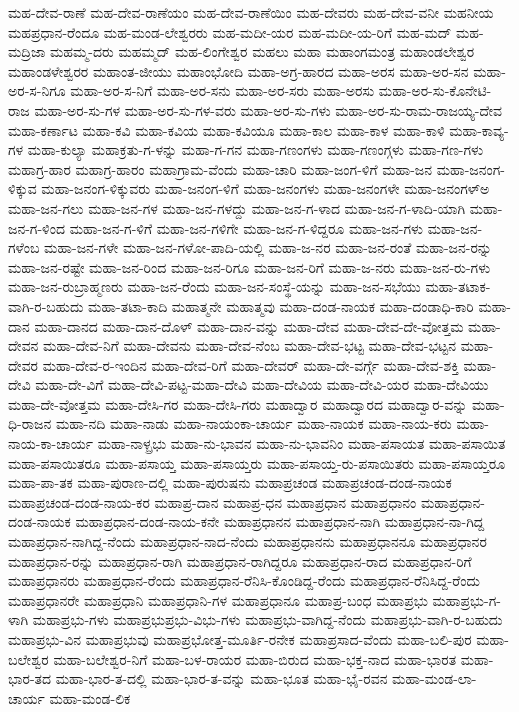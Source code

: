 ಮಹ-ದೇವ-ರಾಣೆ
ಮಹ-ದೇವ-ರಾಣೆಯಂ
ಮಹ-ದೇವ-ರಾಣೆಯಿಂ
ಮಹ-ದೇವರು
ಮಹ-ದೇವ-ವನೀ
ಮಹನೀಯ
ಮಹಪ್ರಧಾನ-ರೆಂದೂ
ಮಹ-ಮಂಡ-ಲೇಶ್ವರರು
ಮಹ-ಮದೀ-ಯರ
ಮಹ-ಮದೀ-ಯ-ರಿಗೆ
ಮಹ-ಮದ್
ಮಹ-ಮದ್ರಿಜಾ
ಮಹಮ್ಮ-ದರು
ಮಹಮ್ಮದ್
ಮಹ-ಲಿಂಗೇಶ್ವರ
ಮಹಲು
ಮಹಾ
ಮಹಾಂಗಮಂತ್ರ
ಮಹಾಂಡಲೇಶ್ವರ
ಮಹಾಂಡಳೇಶ್ವರರ
ಮಹಾಂತ-ಜೀಯು
ಮಹಾಂಭೋದಿ
ಮಹಾ-ಅಗ್ರ-ಹಾರದ
ಮಹಾ-ಅರಸ
ಮಹಾ-ಅರ-ಸನ
ಮಹಾ-ಅರ-ಸ-ನಿಗೂ
ಮಹಾ-ಅರ-ಸ-ನಿಗೆ
ಮಹಾ-ಅರ-ಸನು
ಮಹಾ-ಅರ-ಸರು
ಮಹಾ-ಅರಸು
ಮಹಾ-ಅರ-ಸು-ಕೊನೇಟಿ-ರಾಜ
ಮಹಾ-ಅರ-ಸು-ಗಳ
ಮಹಾ-ಅರ-ಸು-ಗಳ-ವರು
ಮಹಾ-ಅರ-ಸು-ಗಳು
ಮಹಾ-ಅರ-ಸು-ರಾಮ-ರಾಜಯ್ಯ-ದೇವ
ಮಹಾ-ಕರ್ಣಾಟ
ಮಹಾ-ಕವಿ
ಮಹಾ-ಕವಿಯ
ಮಹಾ-ಕವಿಯೂ
ಮಹಾ-ಕಾಲ
ಮಹಾ-ಕಾಳ
ಮಹಾ-ಕಾಳಿ
ಮಹಾ-ಕಾವ್ಯ-ಗಳ
ಮಹಾ-ಕುಲ್ಯಾ
ಮಹಾಕ್ರತು-ಗ-ಳನ್ನು
ಮಹಾ-ಗ-ಗನ
ಮಹಾ-ಗಣಂಗಳು
ಮಹಾ-ಗಣಂಗ್ಗಳು
ಮಹಾ-ಗಣ-ಗಳು
ಮಹಾಗ್ರ-ಹಾರ
ಮಹಾಗ್ರ-ಹಾರಂ
ಮಹಾಗ್ರಾಮ-ವೆಂದು
ಮಹಾ-ಚಾರಿ
ಮಹಾ-ಜಂಗ-ಳಿಗೆ
ಮಹಾ-ಜನ
ಮಹಾ-ಜನಂಗ-ಳಿಕ್ಕುವ
ಮಹಾ-ಜನಂಗ-ಳಿಕ್ಕುವರು
ಮಹಾ-ಜನಂಗ-ಳಿಗೆ
ಮಹಾ-ಜನಂಗಳು
ಮಹಾ-ಜನಂಗಳೇ
ಮಹಾ-ಜನಂಗಳ್ಅ
ಮಹಾ-ಜನ-ಗಲು
ಮಹಾ-ಜನ-ಗಳ
ಮಹಾ-ಜನ-ಗಳದ್ದು
ಮಹಾ-ಜನ-ಗ-ಳಾದ
ಮಹಾ-ಜನ-ಗ-ಳಾದಿ-ಯಾಗಿ
ಮಹಾ-ಜನ-ಗ-ಳಿಂದ
ಮಹಾ-ಜನ-ಗ-ಳಿಗೆ
ಮಹಾ-ಜನ-ಗಳಿಗೇ
ಮಹಾ-ಜನ-ಗ-ಳಿದ್ದರೂ
ಮಹಾ-ಜನ-ಗಳು
ಮಹಾ-ಜನ-ಗಳೆಂಬ
ಮಹಾ-ಜನ-ಗಳೇ
ಮಹಾ-ಜನ-ಗಳೋ-ಪಾದಿ-ಯಲ್ಲಿ
ಮಹಾ-ಜ-ನರ
ಮಹಾ-ಜನ-ರಂತೆ
ಮಹಾ-ಜನ-ರನ್ನು
ಮಹಾ-ಜನ-ರಷ್ಟೇ
ಮಹಾ-ಜನ-ರಿಂದ
ಮಹಾ-ಜನ-ರಿಗೂ
ಮಹಾ-ಜನ-ರಿಗೆ
ಮಹಾ-ಜ-ನರು
ಮಹಾ-ಜನ-ರು-ಗಳು
ಮಹಾ-ಜನ-ರುಬ್ರಾಹ್ಮಣರು
ಮಹಾ-ಜನ-ರೆಂದು
ಮಹಾ-ಜನ-ಸಂಸ್ಥೆ-ಯನ್ನು
ಮಹಾ-ಜನ-ಸಭೆಯು
ಮಹಾ-ತಟಾಕ-ವಾಗಿ-ರ-ಬಹುದು
ಮಹಾ-ತಟಾ-ಕಾದಿ
ಮಹಾತ್ಮನೇ
ಮಹಾತ್ಮವು
ಮಹಾ-ದಂಡ-ನಾಯಕ
ಮಹಾ-ದಂಡಾಧಿ-ಕಾರಿ
ಮಹಾ-ದಾನ
ಮಹಾ-ದಾನದ
ಮಹಾ-ದಾನ-ದೊಳ್
ಮಹಾ-ದಾನ-ವನ್ನು
ಮಹಾ-ದೇವ
ಮಹಾ-ದೇವ-ದೇ-ವೋತ್ತಮ
ಮಹಾ-ದೇವನ
ಮಹಾ-ದೇವ-ನಿಗೆ
ಮಹಾ-ದೇವನು
ಮಹಾ-ದೇವ-ನೆಂಬ
ಮಹಾ-ದೇವ-ಭಟ್ಟ
ಮಹಾ-ದೇವ-ಭಟ್ಟನ
ಮಹಾ-ದೇವರ
ಮಹಾ-ದೇವ-ರ-ಇಂದಿನ
ಮಹಾ-ದೇವ-ರಿಗೆ
ಮಹಾ-ದೇವರ್
ಮಹಾ-ದೇ-ವರ್ಗ್ಗೆ
ಮಹಾ-ದೇವ-ಶಕ್ತಿ
ಮಹಾ-ದೇವಿ
ಮಹಾ-ದೇ-ವಿಗೆ
ಮಹಾ-ದೇವಿ-ಪಟ್ಟ-ಮಹಾ-ದೇವಿ
ಮಹಾ-ದೇವಿಯ
ಮಹಾ-ದೇವಿ-ಯರ
ಮಹಾ-ದೇವಿಯು
ಮಹಾ-ದೇ-ವೋತ್ತಮ
ಮಹಾ-ದೇಸಿ-ಗರ
ಮಹಾ-ದೇಸಿ-ಗರು
ಮಹಾದ್ವಾರ
ಮಹಾದ್ವಾರದ
ಮಹಾದ್ವಾರ-ವನ್ನು
ಮಹಾ-ಧಿ-ರಾಜನ
ಮಹಾ-ನದಿ
ಮಹಾ-ನಾಡು
ಮಹಾ-ನಾಯಂಕಾ-ಚಾರ್ಯ
ಮಹಾ-ನಾಯಕ
ಮಹಾ-ನಾಯ-ಕರು
ಮಹಾ-ನಾಯ-ಕಾ-ಚಾರ್ಯ
ಮಹಾ-ನಾಳ್ಪ್ರಭು
ಮಹಾ-ನು-ಭಾವನ
ಮಹಾ-ನು-ಭಾವನಿಂ
ಮಹಾ-ಪಸಾಯತ
ಮಹಾ-ಪಸಾಯಿತ
ಮಹಾ-ಪಸಾಯಿತರೂ
ಮಹಾ-ಪಸಾಯ್ತ
ಮಹಾ-ಪಸಾಯ್ತರು
ಮಹಾ-ಪಸಾಯ್ತ-ರು-ಪಸಾಯಿತರು
ಮಹಾ-ಪಸಾಯ್ತರೂ
ಮಹಾ-ಪಾ-ತಕ
ಮಹಾ-ಪುರಾಣ-ದಲ್ಲಿ
ಮಹಾ-ಪುರುಷನು
ಮಹಾಪ್ರಚಂಡ
ಮಹಾಪ್ರಚಂಡ-ದಂಡ-ನಾಯಕ
ಮಹಾಪ್ರಚಂಡ-ದಂಡ-ನಾಯ-ಕರ
ಮಹಾಪ್ರ-ದಾನ
ಮಹಾಪ್ರ-ಧನ
ಮಹಾಪ್ರಧಾನ
ಮಹಾಪ್ರಧಾನಂ
ಮಹಾಪ್ರಧಾನ-ದಂಡ-ನಾಯಕ
ಮಹಾಪ್ರಧಾನ-ದಂಡ-ನಾಯ-ಕನೇ
ಮಹಾಪ್ರಧಾನನ
ಮಹಾಪ್ರಧಾನ-ನಾಗಿ
ಮಹಾಪ್ರಧಾನ-ನಾ-ಗಿದ್ದ
ಮಹಾಪ್ರಧಾನ-ನಾಗಿದ್ದ-ನೆಂದು
ಮಹಾಪ್ರಧಾನ-ನಾದ-ನೆಂದು
ಮಹಾಪ್ರಧಾನನು
ಮಹಾಪ್ರಧಾನನೂ
ಮಹಾಪ್ರಧಾನರ
ಮಹಾಪ್ರಧಾನ-ರನ್ನು
ಮಹಾಪ್ರಧಾನ-ರಾಗಿ
ಮಹಾಪ್ರಧಾನ-ರಾಗಿದ್ದರೂ
ಮಹಾಪ್ರಧಾನ-ರಾದ
ಮಹಾಪ್ರಧಾನ-ರಿಗೆ
ಮಹಾಪ್ರಧಾನರು
ಮಹಾಪ್ರಧಾನ-ರೆಂದು
ಮಹಾಪ್ರಧಾನ-ರೆನಿಸಿ-ಕೊಂಡಿದ್ದ-ರೆಂದು
ಮಹಾಪ್ರಧಾನ-ರೆನಿಸಿದ್ದ-ರೆಂದು
ಮಹಾಪ್ರಧಾನರೇ
ಮಹಾಪ್ರಧಾನಿ
ಮಹಾಪ್ರಧಾನಿ-ಗಳ
ಮಹಾಪ್ರಧಾನೂ
ಮಹಾಪ್ರ-ಬಂಧ
ಮಹಾಪ್ರಭು
ಮಹಾಪ್ರಭು-ಗ-ಳಾಗಿ
ಮಹಾಪ್ರಭು-ಗಳು
ಮಹಾಪ್ರಭುಪ್ರಭು-ವಿಭು-ಗಳು
ಮಹಾಪ್ರಭು-ವಾಗಿದ್ದ-ನೆಂದು
ಮಹಾಪ್ರಭು-ವಾಗಿ-ರ-ಬಹುದು
ಮಹಾಪ್ರಭು-ವಿನ
ಮಹಾಪ್ರಭುವು
ಮಹಾಪ್ರಭೋತ್ತ-ಮೂರ್ತಿ-ರನೇಕ
ಮಹಾಪ್ರಸಾದ-ವೆಂದು
ಮಹಾ-ಬಲಿ-ಪುರ
ಮಹಾ-ಬಲೇಶ್ವರ
ಮಹಾ-ಬಲೇಶ್ವರ-ನಿಗೆ
ಮಹಾ-ಬಳ-ರಾಯರ
ಮಹಾ-ಬಿರುದ
ಮಹಾ-ಭಕ್ತ-ನಾದ
ಮಹಾ-ಭಾರತ
ಮಹಾ-ಭಾರ-ತದ
ಮಹಾ-ಭಾರ-ತ-ದಲ್ಲಿ
ಮಹಾ-ಭಾರ-ತ-ವನ್ನು
ಮಹಾ-ಭೂತ
ಮಹಾ-ಭೈ-ರವನ
ಮಹಾ-ಮಂಡ-ಲಾ-ಚಾರ್ಯ
ಮಹಾ-ಮಂಡ-ಲಿಕ
